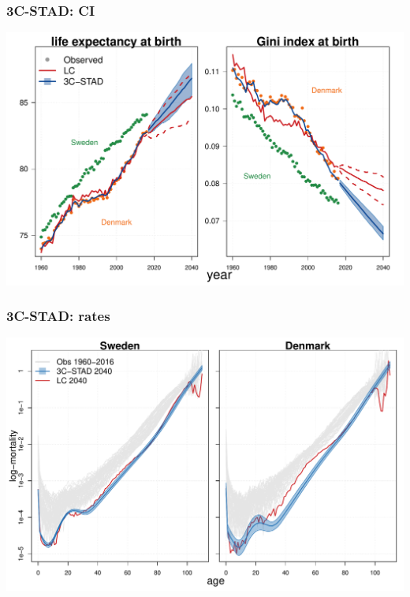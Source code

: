 \documentclass[12pt, xcolor=table]{beamer}  %
\begin{document}
\begin{frame}[noframenumbering]\frametitle{3C-STAD: CI}

\vspace{-0.5cm}
	
	
	\begin{center}	
		\vspace{0.2cm}
		
		\includegraphics[scale=.42]{Figures/Ch3/F4_a3}
		
	\end{center}
	
\end{frame}


\begin{frame}[noframenumbering]\frametitle{3C-STAD: rates}

\vspace{-0.5cm}
	
	
	\begin{center}	
		\vspace{0.2cm}
		
		\includegraphics[scale=.42]{Figures/Ch3/F_rates}
		
	\end{center}
	
\end{frame}
\end{document}
